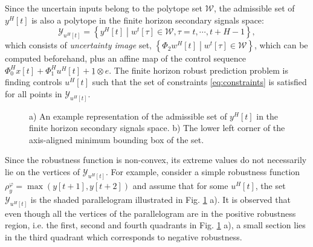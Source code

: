 \documentclass[letterpaper, 10 pt, conference]{ieeeconf}
\begin{document}
Since the uncertain inputs belong to the polytope set $\mathcal{W}$, the admissible set of $y^H[t]$ is also a polytope in the finite horizon secondary signals space:
\begin{equation}
\mathcal{Y}_{u^H[t]}=\left \{ y^H[t] \middle| w^t[\tau] \in \mathcal{W}, \tau=t,\cdots,t+H-1 \right\},
\end{equation}
which consists of \emph{uncertainty image} set, $\left\{ \Phi_2 w^H[t] \middle| w^t[\tau] \in \mathcal{W} \right\} $, which can be computed beforehand, plus an affine map of the control sequence $\Phi_0^H x[t]+\Phi_1^Hu^H[t]+\underline{1}\otimes e$. The finite horizon robust prediction problem is finding controls $u^H[t]$ such that the set of constraints \eqref{eq:constraints} is satisfied for all points in $\mathcal{Y}_{u^H[t]}$. 
\begin{figure}[t]
\centering
{}
\caption{a) An example representation of the admissible set of $y^H[t]$ in the finite horizon secondary signals space. b) The lower left corner of the axis-aligned minimum bounding box of the set. }
\label{fig:shaded}
\end{figure}
Since the robustness function is non-convex, its extreme values do not necessarily lie on the vertices of $\mathcal{Y}_{u^H[t]}$. For example,
consider a simple robustness function $\rho_y^\varphi=\max(y[t+1],y[t+2])$ and assume that for some $u^H[t]$, the set $\mathcal{Y}_{u^H[t]}$ is the shaded parallelogram illustrated in Fig. \ref{fig:shaded} a). It is observed that even though all the vertices of the parallelogram are in the positive robustness region, i.e. the first, second and fourth quadrants in Fig. \ref{fig:shaded} a), a small section lies in the third quadrant which corresponds to negative robustness. 
\end{document}
